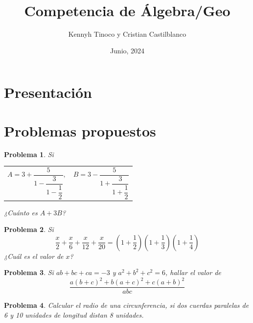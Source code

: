 \documentclass[12pt]{beamer}
\title{Competencia de Álgebra/Geo}
\author{Kennyh Tinoco y Cristian Castilblanco}
\institute{Curso de Polinomios\\ Academia Sabatina de Jóvenes Talento}
\date{Junio, 2024}
\newtheorem{section-problem}{Problema}
\begin{document}
   \section{Presentación}

   \frame{\titlepage}

   \section{Problemas propuestos}

   \begin{frame}
      \begin{section-problem}
         Si
         \begin{table}[H]
            \centering
            \begin{tabular}{p{4cm} p{4cm}}
               $A = 3 + \dfrac{5}{1 - \dfrac{3}{1 - \dfrac{1}{2}}},$
               &
               $B = 3 - \dfrac{5}{1 + \dfrac{3}{1 + \dfrac{1}{2}}}$
            \end{tabular}
         \end{table}
         ¿Cuánto es $A + 3B$?
      \end{section-problem}
   \end{frame}

   \begin{frame}
      \begin{section-problem}
         Si
         \[\frac{x}{2} + \frac{x}{6} + \frac{x}{12} + \frac{x}{20} = \left(1 + \frac{1}{2}\right)\left(1 + \frac{1}{3}\right)\left(1 + \frac{1}{4}\right)\]
         ¿Cuál es el valor de $x$?
      \end{section-problem}
   \end{frame}

   \begin{frame}
      \begin{section-problem}
         Si $ab + bc + ca = -3$ y $a^2 + b^2 + c^2 = 6$, hallar el valor de
         \[\frac{a(b + c)^2 + b(a + c)^2 + c(a + b)^2}{abc}\]
      \end{section-problem}
   \end{frame}

   \begin{frame}
      \begin{section-problem}
         Calcular el radio de una circunferencia, si dos cuerdas paralelas de 6 y 10 unidades de longitud distan 8 unidades.
      \end{section-problem}
   \end{frame}
\end{document}
